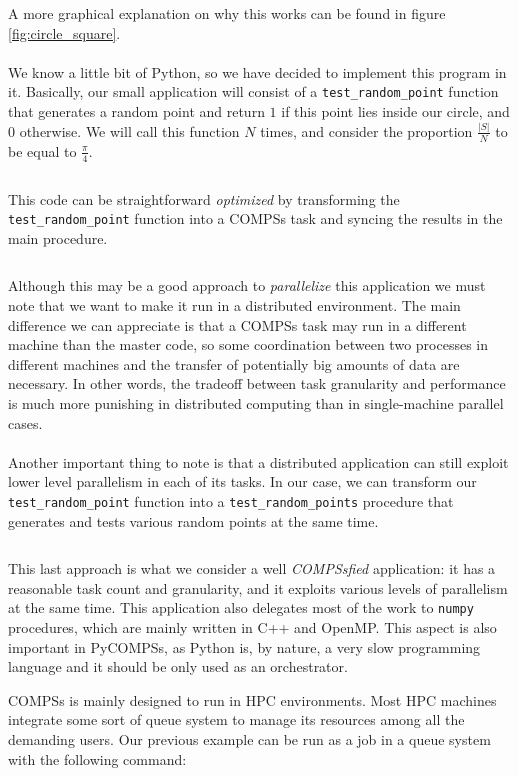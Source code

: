 A more graphical explanation on why this works can be found in figure \ref{fig:circle_square}.\\
\\
We know a little bit of Python, so we have decided to implement this program in it. Basically, our small application will consist of a \verb|test_random_point| function that generates a random point and return $1$ if this point lies inside our circle, and $0$ otherwise. We will call this function $N$ times, and consider the proportion $\frac{|S|}{N}$ to be equal to $\frac{\pi}{4}$.
\inputminted{python}{applications/PI_SQUARE/sequential.py}
This code can be straightforward \textit{optimized} by transforming the \verb|test_random_point| function into a COMPSs task and syncing the results in the main procedure.
\inputminted{python}{applications/PI_SQUARE/pycompss_naive.py}
Although this may be a good approach to \textit{parallelize} this application we must note that we want to make it run in a distributed environment. The main difference we can appreciate is that a COMPSs task may run in a different machine than the master code, so some coordination between two processes in different machines and the transfer of potentially big amounts of data are necessary. In other words, the tradeoff between task granularity and performance is much more punishing in distributed computing than in single-machine parallel cases.\\
\\
Another important thing to note is that a distributed application can still exploit lower level parallelism in each of its tasks. In our case, we can transform our \verb|test_random_point| function into a \verb|test_random_points| procedure that generates and tests various random points at the same time.

\inputminted{python}{applications/PI_SQUARE/pycompss_vectorized.py}

This last approach is what we consider a well \textit{COMPSsfied} application: it has a reasonable task count and granularity, and it exploits various levels of parallelism at the same time. This application also delegates most of the work to \verb|numpy| procedures, which are mainly written in C++ and OpenMP. This aspect is also important in PyCOMPSs, as Python is, by nature, a very slow programming language and it should be only used as an orchestrator.

COMPSs is mainly designed to run in HPC environments. Most HPC machines integrate some sort of queue system to manage its resources among all the demanding users. Our previous example can be run as a job in a queue system with the following command:

